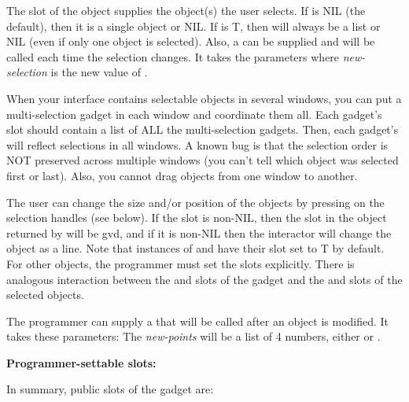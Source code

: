 The  slot of the  object supplies
the object(s) the user selects.  If  is NIL
(the default), then it is a single object or NIL.  If 
is T, then will always be a list or NIL (even if only one object is
selected).   Also, a  can be
supplied and will be called each time the selection changes.  It takes
the parameters
where {\it new-selection} is the new value of .

When your interface contains selectable objects in several windows,
you can put a multi-selection gadget in each window and coordinate
them all.  Each gadget's  slot
should contain a list of ALL the multi-selection gadgets.  Then, each
gadget's  will reflect selections in all windows.  A known
bug is that the selection order is NOT preserved across multiple
windows (you can't tell which object was selected first or last).
Also, you cannot drag objects from one window to another.

The user can change the size and/or position of the objects by
pressing on the selection handles (see below).  If the
 slot is non-NIL, then the  slot in the object
returned by  will be gvd, and if it is non-NIL then the
interactor will change the object as a line.  Note that instances of
 and  have their  slot set
to T by default.  For other objects, the programmer must
set the  slots explicitly.  There is analogous interaction
between the  and  slots of the
gadget and the  and  slots of the selected objects.

The programmer can supply a  that will
be called after an object is modified.  It takes these
parameters: 
The {\it new-points} will be a list of 4 numbers, either
 or .



{\bf Programmer-settable slots:}

In summary, public slots of the  gadget are:

